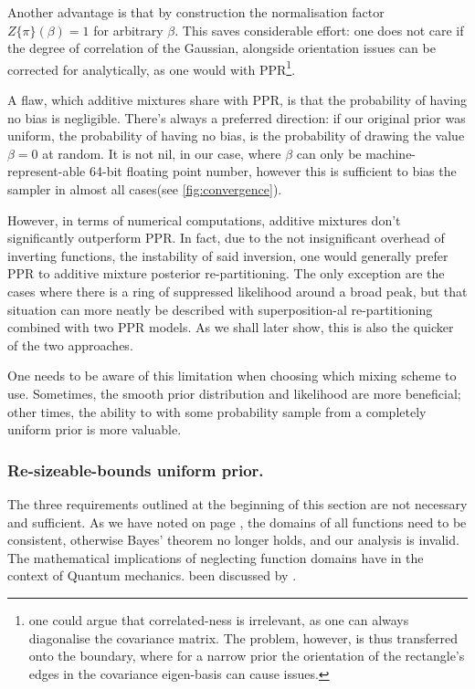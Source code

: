 \documentclass[usenatbib]{mnras}
\begin{document}
Another advantage is that by construction the normalisation factor
\(Z \{ \pi\}(\beta) = 1\) for arbitrary \(\beta\). This saves
considerable effort: one does not care if the degree of
correlation of the Gaussian, alongside orientation issues can be
corrected for analytically, as one would with PPR\footnote{one could
argue that correlated-ness is irrelevant, as one can always
diagonalise the covariance matrix. The problem, however, is thus
transferred onto the boundary, where for a narrow prior the
orientation of the rectangle's edges in the covariance eigen-basis
can cause issues.}. 


A flaw, which additive mixtures share with PPR, is that the
probability of having no bias is negligible. There's always a
preferred direction: if our original prior was uniform, the
probability of having no bias, is the probability of drawing the
value \(\beta=0\) at random. It is not nil, in our case, where
\(\beta\) can only be machine-represent-able 64-bit floating point
number, however this is sufficient to bias the sampler in almost
all cases(see \autoref{fig:convergence}). 

However, in terms of numerical computations, additive mixtures
don't significantly outperform PPR. In fact, due to the not
insignificant overhead of inverting functions, the instability of
said inversion, one would generally prefer PPR to additive mixture
posterior re-partitioning. The only exception are the cases where
there is a ring of suppressed likelihood around a broad peak, but
that situation can more neatly be described with superposition-al
re-partitioning combined with two PPR models. As we shall later
show, this is also the quicker of the two approaches.

One needs to be aware of this limitation when choosing which
mixing scheme to use. Sometimes, the smooth prior distribution and
likelihood are more beneficial; other times, the ability to with
some probability sample from a completely uniform prior is more
valuable. 



\subsubsection{Re-sizeable-bounds uniform prior.}
\label{sec:org9627a3c}

The three requirements outlined at the beginning of this section
are not necessary and sufficient. As we have noted on page
\pageref{domain-discussion}, the domains of all functions need to be
consistent, otherwise Bayes' theorem no longer holds, and our
analysis is invalid. The mathematical implications of neglecting
function domains have in the context of Quantum mechanics. been
discussed by \cite{Gieres_2000}.
\end{document}
